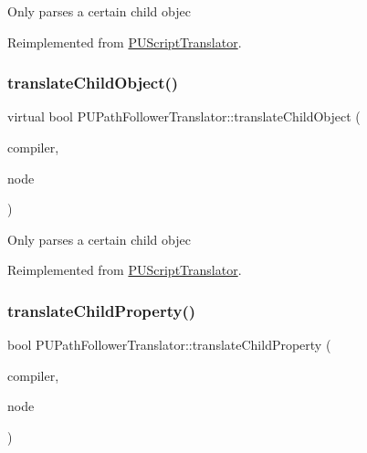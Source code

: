 Only parses a certain child objec 

Reimplemented from \hyperlink{classPUScriptTranslator_ab587d01348ae3e678cb700c719b2b113}{P\+U\+Script\+Translator}.

\mbox{\label{classPUPathFollowerTranslator_a6ed9a908748902c9e33d3b87673de713}} 
\subsubsection{\texorpdfstring{translate\+Child\+Object()}{translateChildObject()}\hspace{0.1cm}{\footnotesize\ttfamily [2/2]}}
{\footnotesize\ttfamily virtual bool P\+U\+Path\+Follower\+Translator\+::translate\+Child\+Object (\begin{DoxyParamCaption}\item[{\hyperlink{classPUScriptCompiler}{P\+U\+Script\+Compiler} $\ast$}]{compiler,  }\item[{\hyperlink{classPUAbstractNode}{P\+U\+Abstract\+Node} $\ast$}]{node }\end{DoxyParamCaption})\hspace{0.3cm}{\ttfamily [virtual]}}

Only parses a certain child objec 

Reimplemented from \hyperlink{classPUScriptTranslator_ab587d01348ae3e678cb700c719b2b113}{P\+U\+Script\+Translator}.

\mbox{\label{classPUPathFollowerTranslator_a586fc96a69d8ec7915960b1cdb4e35e2}} 
\subsubsection{\texorpdfstring{translate\+Child\+Property()}{translateChildProperty()}\hspace{0.1cm}{\footnotesize\ttfamily [1/2]}}
{\footnotesize\ttfamily bool P\+U\+Path\+Follower\+Translator\+::translate\+Child\+Property (\begin{DoxyParamCaption}\item[{\hyperlink{classPUScriptCompiler}{P\+U\+Script\+Compiler} $\ast$}]{compiler,  }\item[{\hyperlink{classPUAbstractNode}{P\+U\+Abstract\+Node} $\ast$}]{node }\end{DoxyParamCaption})\hspace{0.3cm}{\ttfamily [virtual]}}

